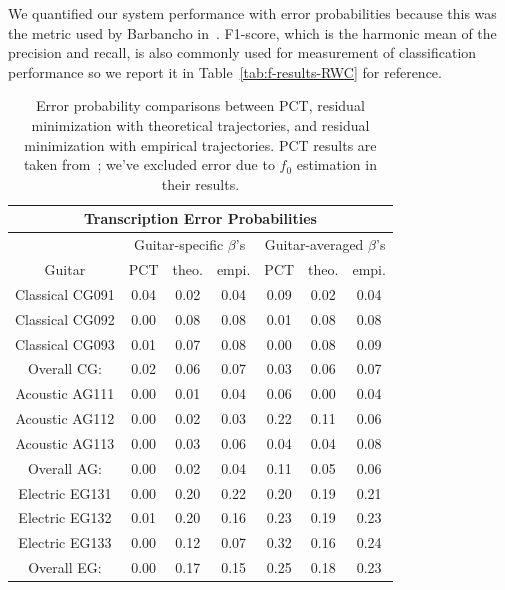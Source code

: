 \documentclass[12pt]{cmuthesis}
\begin{document}
We quantified our system performance with error probabilities because this was the metric used by Barbancho in~\cite{barbanchoi2012}. F1-score, which is the harmonic mean of the precision and recall, is also commonly used for measurement of classification performance so we report it in Table~\ref{tab:f-results-RWC} for reference.

\begin{table}[!htbp]
\begin{center}
\begin{tabular} {||c||c|c|c||c|c|c||}
\hline
\multicolumn{7}{|c|}{\bf{Transcription Error Probabilities}} \\
\hline
 & \multicolumn{3}{|c|}{Guitar-specific $\beta$'s} & \multicolumn{3}{|c|}{Guitar-averaged $\beta$'s}\\
\hline
Guitar & PCT & theo. & empi. & PCT & theo. & empi.\\
\hline
\hline
Classical CG091 & 0.04 & 0.02 & 0.04 & 0.09 & 0.02 & 0.04\\
\hline
Classical CG092 & 0.00 & 0.08 & 0.08 & 0.01 & 0.08 &  0.08\\
\hline
Classical CG093 & 0.01 & 0.07 & 0.08 & 0.00 & 0.08 & 0.09\\
\hline
Overall CG: & 0.02 & 0.06 & 0.07 & 0.03 & 0.06 & 0.07\\
\hline
\hline
Acoustic AG111 & 0.00 & 0.01 & 0.04 & 0.06 & 0.00 & 0.04 \\
\hline
Acoustic AG112 & 0.00 & 0.02 & 0.03 & 0.22 & 0.11 & 0.06 \\
\hline
Acoustic AG113  & 0.00 & 0.03 & 0.06 & 0.04 & 0.04 & 0.08\\
\hline
Overall AG: & 0.00 & 0.02 & 0.04 & 0.11 & 0.05 & 0.06 \\
\hline
\hline
Electric EG131 & 0.00 & 0.20 & 0.22 & 0.20 & 0.19 & 0.21 \\
\hline
Electric EG132 & 0.01 & 0.20 & 0.16 & 0.23 & 0.19 & 0.23 \\
\hline
Electric EG133 & 0.00 & 0.12 & 0.07 & 0.32 & 0.16  & 0.24 \\
\hline
Overall EG: & 0.00 & 0.17 & 0.15 & 0.25 & 0.18 & 0.23\\
\hline
\end{tabular}
\caption{Error probability comparisons between PCT, residual minimization with theoretical trajectories, and residual minimization with empirical trajectories. PCT results are taken from~\cite{barbanchoi2012}; we've excluded error due to $f_0$ estimation in their results.}
\label{tab:error-results-RWC}
\end{center}
\end{table}
\end{document}
